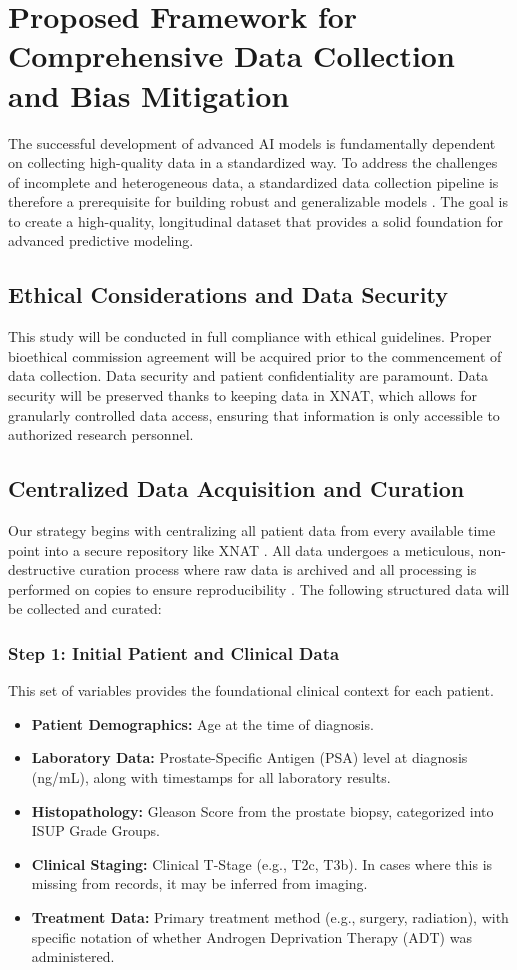 \documentclass[11pt, a4paper]{article}
\begin{document}
\section{Proposed Framework for Comprehensive Data Collection and Bias Mitigation}
The successful development of advanced AI models is fundamentally dependent on collecting high-quality data in a standardized way. To address the challenges of incomplete and heterogeneous data, a standardized data collection pipeline is therefore a prerequisite for building robust and generalizable models \cite{SeoniShahini2024, StamoulouSpanakis2022}. The goal is to create a high-quality, longitudinal dataset that provides a solid foundation for advanced predictive modeling.

\subsection{Ethical Considerations and Data Security}
This study will be conducted in full compliance with ethical guidelines. Proper bioethical commission agreement will be acquired prior to the commencement of data collection. Data security and patient confidentiality are paramount. Data security will be preserved thanks to keeping data in XNAT, which allows for granularly controlled data access, ensuring that information is only accessible to authorized research personnel.

\subsection{Centralized Data Acquisition and Curation}
Our strategy begins with centralizing all patient data from every available time point into a secure repository like XNAT \cite{Marcus_2007}. All data undergoes a meticulous, non-destructive curation process where raw data is archived and all processing is performed on copies to ensure reproducibility \cite{KimKazmierski2025}. The following structured data will be collected and curated:

\subsubsection{Step 1: Initial Patient and Clinical Data}
This set of variables provides the foundational clinical context for each patient.
\begin{itemize}
    \item \textbf{Patient Demographics:} Age at the time of diagnosis.
    \item \textbf{Laboratory Data:} Prostate-Specific Antigen (PSA) level at diagnosis (ng/mL), along with timestamps for all laboratory results.
    \item \textbf{Histopathology:} Gleason Score from the prostate biopsy, categorized into ISUP Grade Groups.
    \item \textbf{Clinical Staging:} Clinical T-Stage (e.g., T2c, T3b). In cases where this is missing from records, it may be inferred from imaging.
    \item \textbf{Treatment Data:} Primary treatment method (e.g., surgery, radiation), with specific notation of whether Androgen Deprivation Therapy (ADT) was administered.
\end{itemize}
\end{document}
